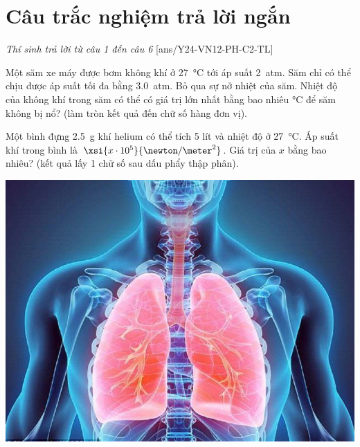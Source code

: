 \section{Câu trắc nghiệm trả lời ngắn} \textit{Thí sinh trả lời từ câu 1 đến câu 6}
\setcounter{ex}{0}
[ans/Y24-VN12-PH-C2-TL]
\begin{ex}
	Một săm xe máy được bơm không khí ở \SI{27}{\celsius} tới áp suất \SI{2}{atm}. Săm chỉ có thể chịu được áp suất tối đa bằng \SI{3.0}{atm}. Bỏ qua sự nở nhiệt của săm. Nhiệt độ của không khí trong săm có thể có giá trị lớn nhất bằng bao nhiêu $\si{\celsius}$ để săm không bị nổ? (làm tròn kết quả đến chữ số hàng đơn vị).
\end{ex}
\begin{ex}
Một bình đựng \SI{2.5}{\gram} khí helium có thể tích 5 lít và nhiệt độ ở \SI{27}{\celsius}. Áp suất khí trong bình là $\xsi{x\cdot10^5}{\newton/\meter^2}$. Giá trị của $x$ bằng bao nhiêu? (kết quả lấy 1 chữ số sau dấu phẩy thập phân).	
\end{ex}
\begin{ex}
	{\includegraphics[scale=0.1]{../figs/Y24-VN12-PH-C2-BT-8}}
\end{ex}
